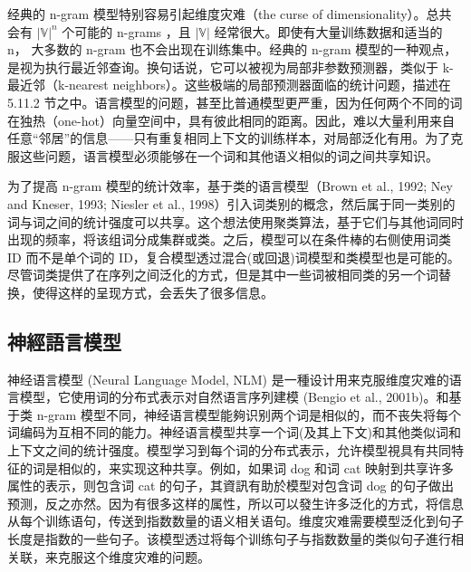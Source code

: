 经典的 n-gram 模型特别容易引起维度灾难（the curse of dimensionality）。总共会有 \(|\mathbb{V}|^n\) 个可能的 n-grams ，且 \(|\mathbb{V}|\) 经常很大。即使有大量训练数据和适当的 n， 大多数的 n-gram 也不会出现在训练集中。经典的 n-gram 模型的一种观点，是视为执行最近邻查询。换句话说，它可以被视为局部非参数预测器，类似于 k-最近邻（k-nearest neighbors）。这些极端的局部预测器面临的统计问题，描述在 5.11.2 节之中。语言模型的问题，甚至比普通模型更严重，因为任何两个不同的词在独热（one-hot）向量空间中，具有彼此相同的距离。因此，难以大量利用来自任意“邻居”的信息——只有重复相同上下文的训练样本，对局部泛化有用。为了克服这些问题，语言模型必须能够在一个词和其他语义相似的词之间共享知识。

为了提高 n-gram 模型的统计效率，基于类的语言模型（Brown et al., 1992; Ney and Kneser, 1993; Niesler et al., 1998）引入词类别的概念，然后属于同一类别的词与词之间的统计强度可以共享。这个想法使用聚类算法，基于它们与其他词同时出现的频率，将该组词分成集群或类。之后，模型可以在条件棒的右侧使用词类 ID 而不是单个词的 ID，复合模型透过混合(或回退)词模型和类模型也是可能的。尽管词类提供了在序列之间泛化的方式，但是其中一些词被相同类的另一个词替换，使得这样的呈现方式，会丢失了很多信息。



\subsection{神經語言模型}


神经语言模型 (Neural Language Model, NLM) 是一種设计用来克服维度灾难的语言模型，它使用词的分布式表示对自然语言序列建模 (Bengio et al., 2001b)。和基于类 n-gram 模型不同，神经语言模型能夠识别两个词是相似的，而不丧失将每个词编码为互相不同的能力。神经语言模型共享一个词(及其上下文)和其他类似词和上下文之间的统计强度。模型学习到每个词的分布式表示，允许模型視具有共同特征的词是相似的，来实现这种共享。例如，如果词 dog 和词 cat 映射到共享许多属性的表示，则包含词 cat 的句子，其資訊有助於模型对包含词 dog 的句子做出预测，反之亦然。因为有很多这样的属性，所以可以發生许多泛化的方式，将信息从每个训练语句，传送到指数数量的语义相关语句。维度灾难需要模型泛化到句子长度是指数的一些句子。该模型透过将每个训练句子与指数数量的类似句子進行相关联，来克服这个维度灾难的问题。



